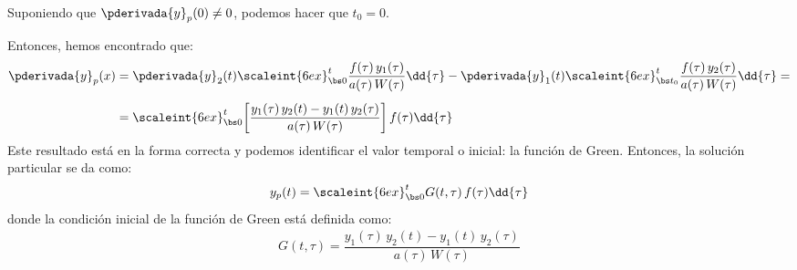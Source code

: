 Suponiendo que $\pderivada{y}_{p} (0) \neq 0$, podemos hacer que $t_{0} = 0$.
\par
Entonces, hemos encontrado que:
\begin{align}
\begin{aligned}[b]
\pderivada{y}_{p} (x) &= \pderivada{y}_{2} (t) \scaleint{6ex}_{\bs 0}^{t} \dfrac{f (\tau) \, y_{1} (\tau)}{a (\tau) \, W (\tau)} \dd{\tau} - \pderivada{y}_{1} (t) \scaleint{6ex}_{\bs t_{0}}^{t} \dfrac{f (\tau) \, y_{2} (\tau)}{a (\tau) \, W (\tau)} \dd{\tau} = \\[0.5em]
&= \scaleint{6ex}_{\bs 0}^{t} \bigg[ \dfrac{y_{1} (\tau) \, y_{2} (t) - y_{1} (t) \, y_{2} (\tau)}{a (\tau) \, W (\tau)} \bigg] \, f (\tau) \dd{\tau}
\end{aligned}
\label{eq:ecuacion_07_19}
\end{align}
Este resultado está en la forma correcta y podemos identificar el valor temporal o inicial: la función de Green. Entonces, la solución particular se da como:
\begin{align}
y_{p} (t) = \scaleint{6ex}_{\bs 0}^{t} G (t, \tau) \, f (\tau) \dd{\tau}
\label{eq:ecuacion_07_20}
\end{align}
donde la condición inicial de la función de Green está definida como:
\begin{align*}
G (t, \tau) = \dfrac{y_{1} (\tau) \, y_{2} (t) - y_{1} (t) \, y_{2} (\tau)}{a (\tau) \, W (\tau)}
\end{align*}

